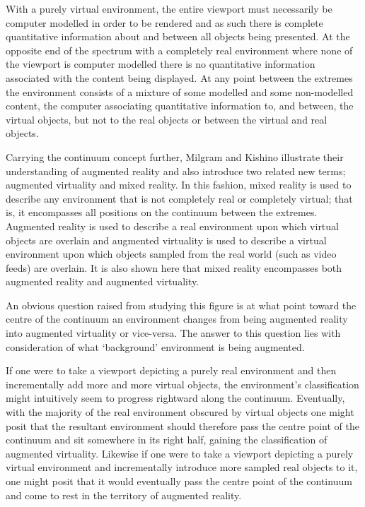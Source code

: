 With a purely virtual environment, the entire viewport must necessarily be computer modelled in order to be rendered and as such there is complete quantitative information about and between all objects being presented. At the opposite end of the spectrum with a completely real environment where none of the viewport is computer modelled there is no quantitative information associated with the content being displayed. At any point between the extremes the environment consists of a mixture of some modelled and some non-modelled content, the computer associating quantitative information to, and between, the virtual objects, but not to the real objects or between the virtual and real objects.

Carrying the continuum concept further, Milgram and Kishino illustrate their understanding of augmented reality and also introduce two related new terms; augmented virtuality and mixed reality. In this fashion, mixed reality is used to describe any environment that is not completely real or completely virtual; that is, it encompasses all positions on the continuum between the extremes. Augmented reality is used to describe a real environment upon which virtual objects are overlain and augmented virtuality is used to describe a virtual environment upon which objects sampled from the real world (such as video feeds) are overlain. It is also shown here that mixed reality encompasses both augmented reality and augmented virtuality.

An obvious question raised from studying this figure is at what point toward the centre of the continuum an environment changes from being augmented reality into augmented virtuality or vice-versa. The answer to this question lies with consideration of what `background' environment is being augmented.

If one were to take a viewport depicting a purely real environment and then incrementally add more and more virtual objects, the environment's classification might intuitively seem to progress rightward along the continuum. Eventually, with the majority of the real environment obscured by virtual objects one might posit that the resultant environment should therefore pass the centre point of the continuum and sit somewhere in its right half, gaining the classification of augmented virtuality. Likewise if one were to take a viewport depicting a purely virtual environment and incrementally introduce more sampled real objects to it, one might posit that it would eventually pass the centre point of the continuum and come to rest in the territory of augmented reality.

